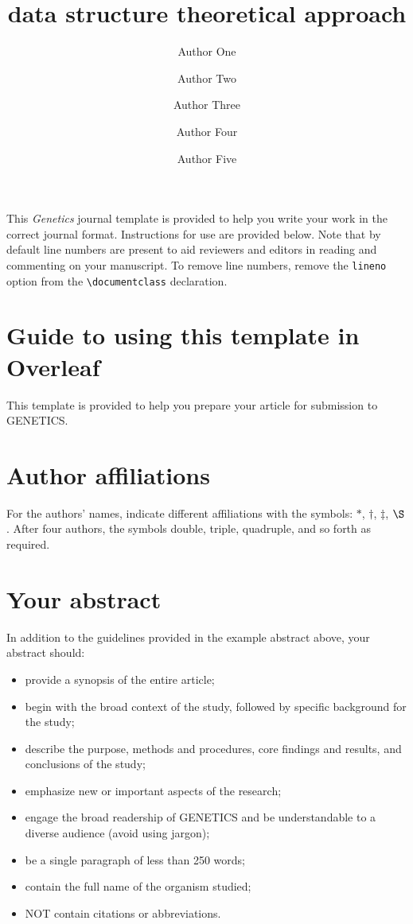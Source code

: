 \documentclass[9pt,twocolumn,twoside,lineno]{gsajnl}
\title{data structure theoretical approach}
\author[1,$\dagger$]{Author One}
\author[1]{Author Two}
\author[2]{Author Three}
\author[2,3]{Author Four}
\author[4,$\ast$]{Author Five}
\affil[1]{Author one affiliation}
\affil[2]{Author two affiliation}
\affil[3]{Author three affiliation}
\affil[4]{Author four affiliation}
\affil[$\dagger$]{These authors contributed equally to this work.}
\begin{document}
\maketitle
\thispagestyle{firststyle}
\vspace{-13pt}%

\lettrine[lines=2]{\color{color2}T}{}his \textit{Genetics} journal template is provided to help you write your work in the correct journal format. Instructions for use are provided below. Note that by default line numbers are present to aid reviewers and editors in reading and commenting on your manuscript. To remove line numbers, remove the \texttt{lineno} option from the \verb|\documentclass| declaration.


\section{Guide to using this template in Overleaf}

This template is provided to help you prepare your article for submission to GENETICS.

\section{Author affiliations}

For the authors' names, indicate different affiliations with the symbols: $\ast$, $\dagger$, $\ddagger$, $\S$. After four authors, the symbols double, triple, quadruple, and so forth as required.

\section{Your abstract}

In addition to the guidelines provided in the example abstract above, your abstract should:

\begin{itemize}
\item provide a synopsis of the entire article;
\item begin with the broad context of the study, followed by specific background for the study;
\item describe the purpose, methods and procedures, core findings and results, and conclusions of the study;
\item emphasize new or important aspects of the research;
\item engage the broad readership of GENETICS and be understandable to a diverse audience (avoid using jargon);
\item be a single paragraph of less than 250 words;
\item contain the full name of the organism studied;
\item NOT contain citations or abbreviations.
\end{itemize}
\end{document}
